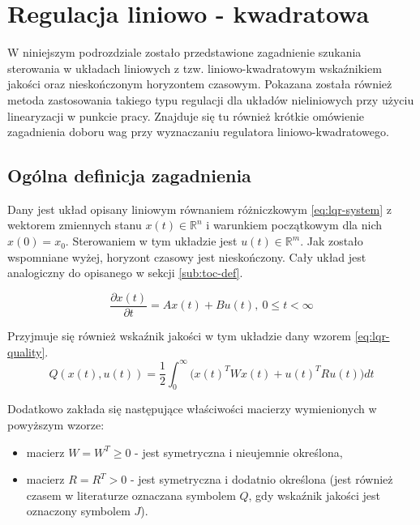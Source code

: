 \section{Regulacja liniowo - kwadratowa}
\label{sec:lqr}

W niniejszym podrozdziale zostało przedstawione zagadnienie szukania sterowania w układach liniowych z tzw. liniowo-kwadratowym wskaźnikiem jakości oraz nieskończonym horyzontem czasowym. Pokazana została również metoda zastosowania takiego typu regulacji dla układów nieliniowych przy użyciu linearyzacji w punkcie pracy. Znajduje się tu również krótkie omówienie zagadnienia doboru wag przy wyznaczaniu regulatora liniowo-kwadratowego.

\subsection{Ogólna definicja zagadnienia}
\label{sub:lqr-def}

Dany jest układ opisany liniowym równaniem różniczkowym \ref{eq:lqr-system} z wektorem zmiennych stanu $x(t) \in \mathbb{R}^{n}$ i warunkiem początkowym dla nich $x(0) = x_{0}$. Sterowaniem w tym układzie jest $u(t) \in \mathbb{R}^{m}$. Jak zostało wspomniane wyżej, horyzont czasowy jest nieskończony. Cały układ jest analogiczny do opisanego w sekcji \ref{sub:toc-def}.

\begin{equation}\label{eq:lqr-system}
\frac{\partial x(t)}{\partial t} = Ax(t) + Bu(t),~ 0 \leq t < \infty
\end{equation}

Przyjmuje się również wskaźnik jakości w tym układzie dany wzorem \ref{eq:lqr-quality}.
\begin{equation}\label{eq:lqr-quality}
Q(x(t), u(t)) = \frac{1}{2}\int_{0}^{\infty} \Big(x(t)^{T}Wx(t) + u(t)^{T}Ru(t)\Big)dt
\end{equation}

Dodatkowo zakłada się następujące właściwości macierzy wymienionych w powyższym wzorze:
\begin{itemize}
    \item macierz $W = W^{T} \geq 0$ - jest symetryczna i nieujemnie określona,
    \item macierz $R = R^{T} > 0$ - jest symetryczna i dodatnio określona (jest również czasem w literaturze oznaczana symbolem $Q$, gdy wskaźnik jakości jest oznaczony symbolem $J$).
\end{itemize}

